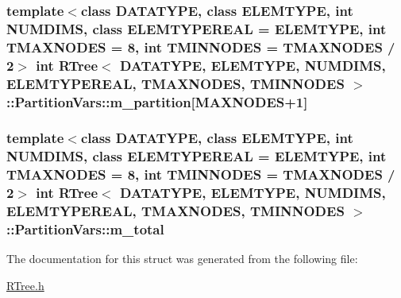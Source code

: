 \hypertarget{structRTree_1_1PartitionVars_a15b570f93f49884ccd637731d033da51}{
\subsubsection[{m\-\_\-partition}]{\setlength{\rightskip}{0pt plus 5cm}template$<$class D\-A\-T\-A\-T\-Y\-P\-E, class E\-L\-E\-M\-T\-Y\-P\-E, int N\-U\-M\-D\-I\-M\-S, class E\-L\-E\-M\-T\-Y\-P\-E\-R\-E\-A\-L = E\-L\-E\-M\-T\-Y\-P\-E, int T\-M\-A\-X\-N\-O\-D\-E\-S = 8, int T\-M\-I\-N\-N\-O\-D\-E\-S = T\-M\-A\-X\-N\-O\-D\-E\-S / 2$>$ int {\bf R\-Tree}$<$ D\-A\-T\-A\-T\-Y\-P\-E, E\-L\-E\-M\-T\-Y\-P\-E, N\-U\-M\-D\-I\-M\-S, E\-L\-E\-M\-T\-Y\-P\-E\-R\-E\-A\-L, T\-M\-A\-X\-N\-O\-D\-E\-S, T\-M\-I\-N\-N\-O\-D\-E\-S $>$\-::Partition\-Vars\-::m\-\_\-partition\mbox{[}{\bf M\-A\-X\-N\-O\-D\-E\-S}+1\mbox{]}}}\label{structRTree_1_1PartitionVars_a15b570f93f49884ccd637731d033da51}
\hypertarget{structRTree_1_1PartitionVars_a145b95cd4210c8e2dbb2015d379906e4}{
\subsubsection[{m\-\_\-total}]{\setlength{\rightskip}{0pt plus 5cm}template$<$class D\-A\-T\-A\-T\-Y\-P\-E, class E\-L\-E\-M\-T\-Y\-P\-E, int N\-U\-M\-D\-I\-M\-S, class E\-L\-E\-M\-T\-Y\-P\-E\-R\-E\-A\-L = E\-L\-E\-M\-T\-Y\-P\-E, int T\-M\-A\-X\-N\-O\-D\-E\-S = 8, int T\-M\-I\-N\-N\-O\-D\-E\-S = T\-M\-A\-X\-N\-O\-D\-E\-S / 2$>$ int {\bf R\-Tree}$<$ D\-A\-T\-A\-T\-Y\-P\-E, E\-L\-E\-M\-T\-Y\-P\-E, N\-U\-M\-D\-I\-M\-S, E\-L\-E\-M\-T\-Y\-P\-E\-R\-E\-A\-L, T\-M\-A\-X\-N\-O\-D\-E\-S, T\-M\-I\-N\-N\-O\-D\-E\-S $>$\-::Partition\-Vars\-::m\-\_\-total}}\label{structRTree_1_1PartitionVars_a145b95cd4210c8e2dbb2015d379906e4}


The documentation for this struct was generated from the following file\-:\begin{DoxyCompactItemize}
\item 
\hyperlink{RTree_8h}{R\-Tree.\-h}\end{DoxyCompactItemize}
